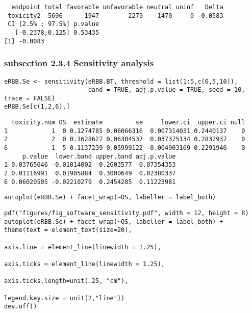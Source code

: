 \documentclass[12pt]{article}
\begin{document}
\begin{verbatim}
  endpoint total favorable unfavorable neutral uninf   Delta
 toxicity2  5696      1947        2279    1470     0 -0.0583
 CI [2.5% ; 97.5%] p.value
   [-0.2378;0.125] 0.53435
[1] -0.0083
\end{verbatim}

\subsubsection{subsection 2.3.4 Sensitivity analysis}
\label{sec:org2c971d8}

\lstset{language=r,label= ,caption= ,captionpos=b,numbers=none}
\begin{lstlisting}
eRBB.Se <- sensitivity(eRBB.BT, threshold = list(1:5,c(0,5,10)),
                       band = TRUE, adj.p.value = TRUE, seed = 10, trace = FALSE)
eRBB.Se[c(1,2,6),]
\end{lstlisting}

\begin{verbatim}
  toxicity.num OS  estimate         se     lower.ci  upper.ci null
1            1  0 0.1274785 0.06066316  0.007314031 0.2440137    0
2            2  0 0.1628627 0.06304537  0.037375134 0.2832937    0
6            1  5 0.1137239 0.05999122 -0.004903169 0.2291946    0
     p.value  lower.band upper.band adj.p.value
1 0.03765646 -0.01014002  0.2603577  0.07354353
2 0.01116991  0.01905884  0.3000649  0.02380337
6 0.06020505 -0.02210279  0.2454285  0.11223981
\end{verbatim}


\lstset{language=r,label= ,caption= ,captionpos=b,numbers=none}
\begin{lstlisting}
autoplot(eRBB.Se) + facet_wrap(~OS, labeller = label_both)
\end{lstlisting}

\lstset{language=r,label= ,caption= ,captionpos=b,numbers=none}
\begin{lstlisting}
pdf("figures/fig_software_sensitivity.pdf", width = 12, height = 8)
autoplot(eRBB.Se) + facet_wrap(~OS, labeller = label_both) + theme(text = element_text(size=20), 
                                                                   axis.line = element_line(linewidth = 1.25),
                                                                   axis.ticks = element_line(linewidth = 1.25),
                                                                   axis.ticks.length=unit(.25, "cm"),
                                                                   legend.key.size = unit(2,"line"))
dev.off()
\end{lstlisting}
\end{document}
